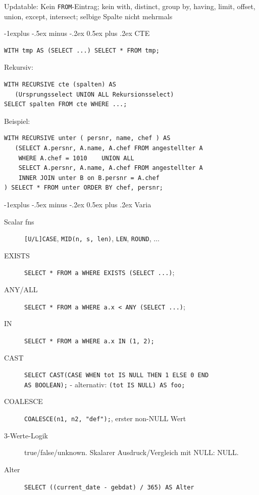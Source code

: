 \documentclass[10pt,landscape,a4paper]{article}
\makeatletter
\renewcommand{\subsection}{\@startsection{subsection}{2}{0mm}%
                                {-1explus -.5ex minus -.2ex}%
                                {0.5ex plus .2ex}%
                                {\normalfont\small\bfseries}}
\newcommand{\sql}[1]{\texttt{#1}}
\makeatother
\begin{document}
\begin{multicols*}{3}
Updatable: Kein \sql{FROM}-Eintrag; kein with, distinct, group by, having,
limit, offset, union, except, intersect; selbige Spalte nicht mehrmals

\subsection{CTE}
\begin{verbatim}
WITH tmp AS (SELECT ...) SELECT * FROM tmp;
\end{verbatim}

Rekursiv:

\begin{verbatim}
WITH RECURSIVE cte (spalten) AS
   (Ursprungsselect UNION ALL Rekursionsselect)
SELECT spalten FROM cte WHERE ...;
\end{verbatim}

Beispiel:

\begin{verbatim}
WITH RECURSIVE unter ( persnr, name, chef ) AS
   (SELECT A.persnr, A.name, A.chef FROM angestellter A
    WHERE A.chef = 1010    UNION ALL
    SELECT A.persnr, A.name, A.chef FROM angestellter A
    INNER JOIN unter B on B.persnr = A.chef
) SELECT * FROM unter ORDER BY chef, persnr;
\end{verbatim}

\subsection{Varia}

\begin{description}
\item[Scalar fns]{\sql{[U/L]CASE}, \sql{MID(n, s, len)}, \sql{LEN}, \sql{ROUND}, $\ldots$}
\item[EXISTS]{\sql{SELECT * FROM a WHERE EXISTS (SELECT ...)};}
\item[ANY/ALL]{\sql{SELECT * FROM a WHERE a.x < ANY (SELECT ...)};}
\item[IN]{\sql{SELECT * FROM a WHERE a.x IN (1, 2);}}
\item[CAST]{\sql{SELECT CAST(CASE WHEN tot IS NULL THEN 1 ELSE 0 END} \\ \sql{AS
      BOOLEAN);} - alternativ: \sql{(tot IS NULL) AS foo;}}
\item[COALESCE]{\sql{COALESCE(n1, n2, "def");}, erster non-NULL Wert}
\item[3-Werte-Logik]{true/false/unknown. Skalarer Ausdruck/Vergleich mit NULL: NULL.}
\item[Alter]{\sql{SELECT ((current_date - gebdat) / 365) AS Alter}}
\end{description}


\end{multicols*}
\end{document}
